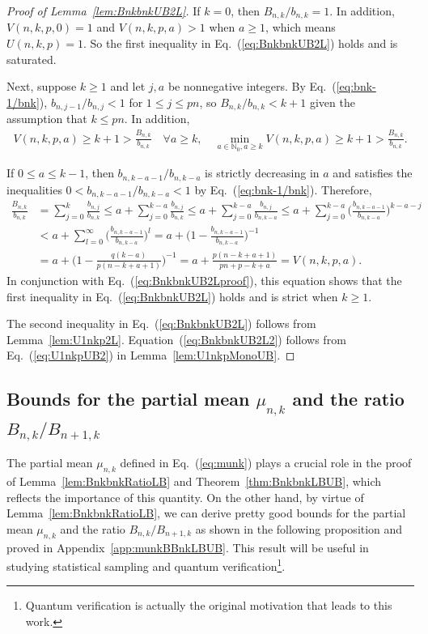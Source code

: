\documentclass[aop]{imsart}
\theoremstyle{plain}
\theoremstyle{remark}
\newcommand{\bbN}{\mathbb{N}}
\newcommand{\1}{\operatorname{\uppercase\expandafter{\romannumeral1}}}
\newcommand{\2}{\operatorname{\uppercase\expandafter{\romannumeral2}}}
\newcommand{\3}{\operatorname{\uppercase\expandafter{\romannumeral3}}}
\newcommand{\4}{\operatorname{\uppercase\expandafter{\romannumeral4}}}
\newcommand{\5}{\operatorname{\uppercase\expandafter{\romannumeral5}}}
\newcommand{\6}{\operatorname{\uppercase\expandafter{\romannumeral6}}}
\newcommand{\7}{\operatorname{\uppercase\expandafter{\romannumeral7}}}
\newcommand{\8}{\operatorname{\uppercase\expandafter{\romannumeral8}}}
\newcommand{\9}{\operatorname{\uppercase\expandafter{\romannumeral9}}}
\newcommand{\eref}[1]{Eq.~\textup{(\ref{#1})}}
\newcommand{\Eref}[1]{Equation~\textup{(\ref{#1})}}
\newcommand{\thref}[1]{Theorem~\ref{#1}}
\newcommand{\lref}[1]{Lemma~\ref{#1}}
\newcommand{\aref}[1]{Appendix~\ref{#1}}
\begin{document}
\begin{proof}[Proof of \lref{lem:BnkbnkUB2L}]
If $k=0$, then 	$B_{n,k}/b_{n,k}=1$. In addition, $V(n,k,p,0)=1$ and $V(n,k,p,a)>1$ when $a\geq 1$, which means $U(n,k,p)=1$. So the first inequality in \eref{eq:BnkbnkUB2L} holds and is saturated. 
	
	
Next, suppose $k\geq 1$ and let $j,a$ be nonnegative integers. By \eref{eq:bnk-1/bnk},  $b_{n,j-1}/b_{n,j}< 1$ for $1\leq j\leq p n$, so 	$B_{n,k}/b_{n,k}<k+1$ given the assumption that $k\leq pn$. In addition,
\begin{align}
V(n,k,p,a)\geq k+1>\frac{B_{n,k}}{b_{n,k}}\quad \forall a\geq k,\quad
 \min_{a\in \bbN_0, a\geq k} V(n,k,p,a)\geq k+1>\frac{B_{n,k}}{b_{n,k}}. \label{eq:BnkbnkUB2Lproof}
\end{align}

If  $0\leq a\leq k-1$, then $b_{n,k-a-1}/b_{n,k-a}$ is strictly decreasing in $a$ and satisfies the inequalities  $0<b_{n,k-a-1}/b_{n,k-a}<1$ by \eref{eq:bnk-1/bnk}. Therefore,
	\begin{align}
	\frac{B_{n,k}}{b_{n,k}}&=\sum_{j=0}^k \frac{b_{n,j}}{b_{n,k}}\leq a+\sum_{j=0}^{k-a} \frac{b_{n,j}}{b_{n,k}}\leq  a+\sum_{j=0}^{k-a} \frac{b_{n,j}}{b_{n,k-a}}\leq  a+\sum_{j=0}^{k-a} \biggl(\frac{b_{n,k-a-1}}{b_{n,k-a}}\biggr)^{k-a-j}\\
	&< a+ \sum_{l=0}^\infty \biggl(\frac{b_{n,k-a-1}}{b_{n,k-a}}\biggr)^l 
=a+  \biggl(1-\frac{b_{n,k-a-1}}{b_{n,k-a}}\biggr)^{-1}\nonumber\\
	&=a+\biggl(1-\frac{q(k-a)}{p(n-k+a+1)}\biggr)^{-1}=a+\frac{p(n-k+a +1)}{p n+p-k+a}=V(n,k,p,a). \nonumber
	\end{align}
In conjunction with \eref{eq:BnkbnkUB2Lproof}, this equation shows that the first inequality in \eref{eq:BnkbnkUB2L} holds and is strict when $k\geq 1$. 

The second inequality in \eref{eq:BnkbnkUB2L} follows from \lref{lem:U1nkp2L}. \Eref{eq:BnkbnkUB2L2} follows from \eref{eq:U1nkpUB2} in 
\lref{lem:U1nkpMonoUB}.
\end{proof}



\subsection{Bounds for the partial mean $\mu_{n,k}$ and the ratio $B_{n,k}/B_{n+1,k}$}

The partial mean $\mu_{n,k}$ defined in \eref{eq:munk} 
plays a crucial role in the proof of \lref{lem:BnkbnkRatioLB} and \thref{thm:BnkbnkLBUB}, which reflects
 the importance of this quantity.
On the other hand, by virtue of  \lref{lem:BnkbnkRatioLB}, we can derive pretty good bounds for the partial mean   $\mu_{n,k}$ and the ratio $B_{n,k}/B_{n+1,k}$ as shown in the following proposition and proved in \aref{app:munkBBnkLBUB}. This result will be useful in studying statistical sampling and quantum verification\footnote{Quantum verification is actually the original motivation that leads to this work.}. 
\end{document}
